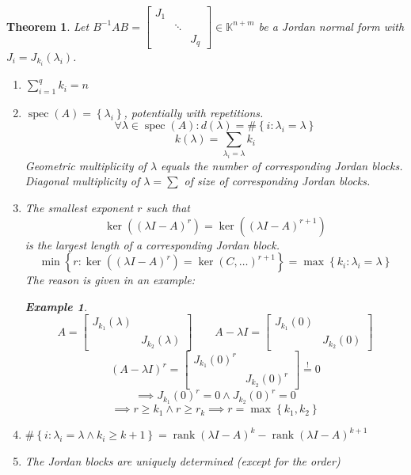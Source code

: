 \documentclass{article}
\newtheorem{theorem}{Theorem}  \numberwithin{theorem}{section}
\newtheorem{example}{Example}  \numberwithin{example}{section}
\newcommand{\set}[1]{\left\{#1\right\}}
\DeclareMathOperator{\rank}{rank}
\begin{document}
\begin{theorem} %
  Let $B^{-1} AB = \begin{bmatrix} J_1 & & \\ & \ddots & \\ & & J_q \end{bmatrix} \in \mathbb K^{n + m}$ be a Jordan normal form with $J_i = J_{k_i}(\lambda_i)$.
  \begin{enumerate}
    \item $\sum_{i=1}^q k_i = n$
    \item $\operatorname{spec}(A) = \set{\lambda_i}$, potentially with repetitions.
      \[ \forall \lambda \in \operatorname{spec}(A): d(\lambda) = \#\set{i: \lambda_i = \lambda} \]
      \[ k(\lambda) = \sum_{\lambda_i = \lambda} k_i \]
      Geometric multiplicity of $\lambda$ equals the number of corresponding Jordan blocks.
      Diagonal multiplicity of $\lambda = \sum$ of size of corresponding Jordan blocks. %
    \item The smallest exponent $r$ such that
      \[ \ker((\lambda I - A)^r) = \ker((\lambda I - A)^{r+1}) \]
      is the largest length of a corresponding Jordan block.
      \[ \min\set{r: \ker((\lambda I - A)^r) = \ker(C, \dots)^{r+1}} = \max\set{k_i: \lambda_i = \lambda} \]
      The reason is given in an example:
      \begin{example}
        \[
          A = \begin{bmatrix}
            J_{k_1}(\lambda) & \\
            & J_{k_2}(\lambda)
          \end{bmatrix}
          \qquad
          A - \lambda I = \begin{bmatrix}
            J_{k_1}(0) & \\
            & J_{k_2}(0)
          \end{bmatrix}
        \] \[
          (A - \lambda I)^r = \begin{bmatrix}
            J_{k_1}(0)^r & \\
            & J_{k_2}(0)^r
          \end{bmatrix}
          \overset!= 0
        \] \[
          \implies J_{k_1}(0)^r = 0 \land J_{k_2}(0)^r = 0
        \] \[
          \implies r \geq k_1 \land r \geq r_k \implies r = \max\set{k_1, k_2}
        \]
      \end{example}
    \item $\#\set{i: \lambda_i = \lambda \land k_i \geq k + 1} = \rank(\lambda I - A)^k - \rank(\lambda I - A)^{k+1}$
    \item The Jordan blocks are uniquely determined (except for the order)
  \end{enumerate}
\end{theorem}
\end{document}

